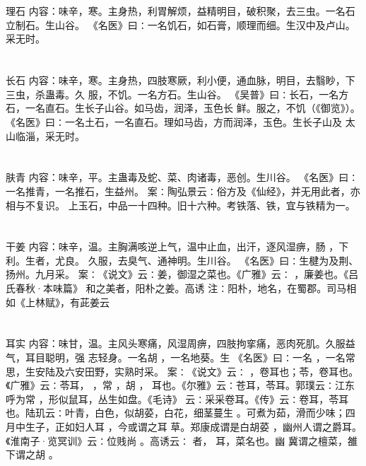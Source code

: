 \documentclass[12pt,UTF8]{ctexbook}
\begin{document}
\section{}理石
内容：味辛，寒。主身热，利胃解烦，益精明目，破积聚，去三虫。一名石立制石。生山谷。 
《名医》曰∶一名饥石，如石膏，顺理而细。生汉中及卢山。采无时。 


\section{}长石
内容：味辛，寒。主身热，四肢寒厥，利小便，通血脉，明目，去翳眇，下三虫，杀蛊毒。久 
服，不饥。一名方石。生山谷。 
《吴普》曰∶长石，一名方石，一名直石。生长子山谷。如马齿，润泽，玉色长 
鲜。服之，不饥（《御览》）。 
《名医》曰∶一名土石，一名直石。理如马齿，方而润泽，玉色。生长子山及 
太山临淄，采无时。 


\section{}肤青
内容：味辛，平。主蛊毒及蛇、菜、肉诸毒，恶创。生川谷。 
《名医》曰∶一名推青，一名推石，生益州。 
案∶陶弘景云∶俗方及《仙经》，并无用此者，亦相与不复识。 
上玉石，中品一十四种。旧十六种。考铁落、铁，宜与铁精为一。 


\section{}干姜
内容：味辛，温。主胸满咳逆上气，温中止血，出汗，逐风湿痹，肠 ，下利。生者，尤良。 
久服，去臭气、通神明。生川谷。 
《名医》曰∶生楗为及荆、扬州。九月采。 
案∶《说文》云∶姜，御湿之菜也。《广雅》云∶ ，廉姜也。《吕氏春秋·本味篇》 
和之美者，阳朴之姜。高诱 
注∶阳朴，地名，在蜀郡。司马相如《上林赋》，有茈姜云 


\section{}耳实
内容：味甘，温。主风头寒痛，风湿周痹，四肢拘挛痛，恶肉死肌。久服益气，耳目聪明，强 
志轻身。一名胡 ，一名地葵。生 
《名医》曰∶一名 ，一名常思，生安陆及六安田野，实熟时采。 
案∶《说文》云∶ ，卷耳也；苓，卷耳也。《广雅》云∶苓耳， ，常 ，胡 ， 
耳也。《尔雅》云∶苍耳，苓耳。郭璞云∶江东呼为常 ，形似鼠耳，丛生如盘。《毛诗》 
云∶采采卷耳。《传》云∶卷耳，苓耳也。陆玑云∶叶青，白色，似胡荽，白花，细茎蔓生 
。可煮为茹，滑而少味；四月中生子，正如妇人耳 ，今或谓之耳 草。郑康成谓是白胡荽 
，幽州人谓之爵耳。《淮南子·览冥训》云∶位贱尚 。高诱云∶ 者， 耳，菜名也。幽 
冀谓之檀菜，雒下谓之胡 。 
\end{document}
